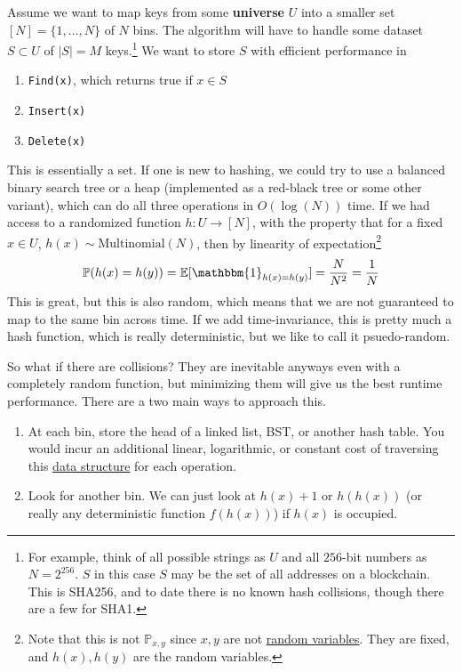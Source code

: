   Assume we want to map keys from some \textbf{universe} $U$ into a smaller set $[N] = \{1, \ldots, N\}$ of $N$ bins. The algorithm will have to handle some dataset $S \subset U$ of $|S| = M$ keys.\footnote{For example, think of all possible strings as $U$ and all $256$-bit numbers as $N = 2^{256}$. $S$ in this case $S$ may be the set of all addresses on a blockchain. This is SHA256, and to date there is no known hash collisions, though there are a few for SHA1.} We want to store $S$ with efficient performance in 
  \begin{enumerate}
    \item \texttt{Find(x)}, which returns true if $x \in S$
    \item \texttt{Insert(x)} 
    \item \texttt{Delete(x)}
    \end{enumerate}
  This is essentially a set. If one is new to hashing, we could try to use a balanced binary search tree or a heap (implemented as a red-black tree or some other variant), which can do all three operations in $O(\log(N))$ time. If we had access to a randomized function $h: U \rightarrow [N]$, with the property that for a fixed $x \in U$, $h(x) \sim \mathrm{Multinomial}(N)$, then by linearity of expectation\footnote{Note that this is not $\mathbb{P}_{x, y}$ since $x, y$ are not \hyperref[prob-def:random-variable]{random variables}. They are fixed, and $h(x), h(y)$ are the random variables. }
  \begin{equation}
    \mathbb{P}(h(x) = h(y)) = \mathbb{E}[\mathbbm{1}_{h(x) = h(y)}] = \frac{N}{N^2} = \frac{1}{N}
  \end{equation}
  This is great, but this is also random, which means that we are not guaranteed to map to the same bin across time. If we add time-invariance, this is pretty much a hash function, which is really deterministic, but we like to call it psuedo-random. 

  So what if there are collisions? They are inevitable anyways even with a completely random function, but minimizing them will give us the best runtime performance. There are a two main ways to approach this. 
  \begin{enumerate}
    \item At each bin, store the head of a linked list, BST, or another hash table. You would incur an additional linear, logarithmic, or constant cost of traversing this \hyperref[def:data-structure]{data structure} for each operation.  
    \item Look for another bin. We can just look at $h(x) + 1$ or $h(h(x))$ (or really any deterministic function $f(h(x))$) if $h(x)$ is occupied. 
  \end{enumerate}

